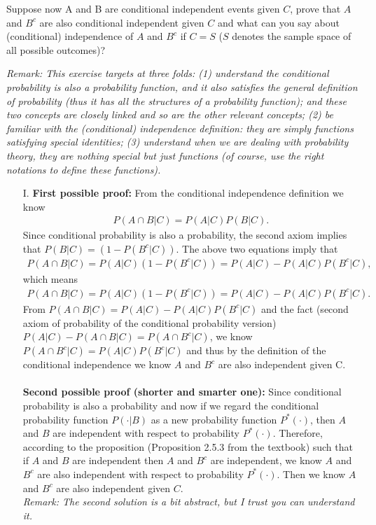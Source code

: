 \begin{exercise}
	Suppose now A and B are conditional independent events given $C$, prove that $A$ and $B^c$ are also conditional independent given $C$ and what can you say about (conditional) independence of $A$ and $B^c$ if $C=S$ ($S$ denotes the sample space of all possible outcomes)? 
	\begin{solution}
		\textit{\scriptsize Remark: 			This exercise targets at three folds: (1) understand the conditional probability is also a probability function, and it also satisfies the general definition of probability (thus it has all the structures of a probability function); and these two concepts are closely linked and so are the other relevant concepts; (2) be familiar with the (conditional) independence definition: they are simply functions satisfying special identities; (3) understand when we are dealing with probability theory, they are nothing special but just functions (of course, use the right notations to define these functions).} \\
		\begin{itemize}
			\item[I.] 		\textbf{First possible proof:}
			From the conditional independence definition we know
			\begin{align*}
				P(A\cap B|C) = 	P(A|C) P(B|C). 
			\end{align*}
			Since conditional probability is also a probability, the second axiom implies that $P(B|C)=(1-P(B^c|C))$. The above two equations imply that 
			\begin{align*}
				P(A\cap B|C) = 	P(A|C)(1-P(B^c|C)) =P(A|C)-P(A|C)P(B^c|C), 
			\end{align*}
			which means 
			\begin{align*}
				P(A\cap B|C) = 	P(A|C)(1-P(B^c|C)) =P(A|C)-P(A|C)P(B^c|C). 
			\end{align*}
			From $				P(A\cap B|C) = P(A|C)-P(A|C)P(B^c|C)$ and the fact (second axiom of probability of the conditional probability version) $P(A|C)-P(A\cap B|C)=P(A\cap B^c|C)$, we know
			$P(A\cap B^c|C) = P(A|C) P(B^c|C)$ and thus by the definition of the conditional independence we know $A$ and $B^c$ are also independent given C. \\~\\
			\textbf{Second possible proof (shorter and smarter one):} 				Since conditional probability is also a probability and now if we regard the conditional probability function $P(\cdot|B)$ as a new probability function $P^*(\cdot)$, then $A$ and $B$ are independent with respect to probability $P^*(\cdot)$. Therefore,  according to the proposition (Proposition 2.5.3 from the textbook) such that if $A$ and $B$ are independent then   $A$ and $B^c$ are independent, we know  $A$ and $B^c$ are also independent with respect to probability $P^*(\cdot)$.  Then we know $A$ and $B^c$ are also independent given $C$.\\ \textit{\scriptsize Remark: The second solution is a bit abstract, but I trust you can understand it.}\\

\end{itemize}
\end{solution}
\end{exercise}
